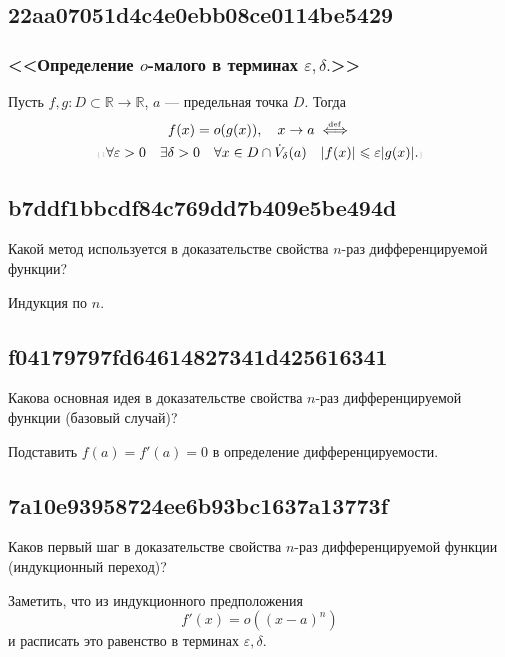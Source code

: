 \documentclass[11pt, a5paper]{article}
\newenvironment{note}[1]{\goodbreak\par\subsection{\hfill \color{lightgray}\tiny #1}}{}
\newenvironment{cloze}[2][\ldots]{\begin{leftbar}}{\end{leftbar}}
\newenvironment{icloze}[2][\ldots]{%
  \ignorespaces\text{\tiny \color{lightgray}\{#2} %
}{%
  \text{\tiny\color{lightgray}\}}\unskip%
}
\begin{document}
\begin{note}{22aa07051d4c4e0ebb08ce0114be5429}
    \subsubsection{<<Определение \( o \)-малого в терминах \( \varepsilon, \delta. \)>>}

    Пусть \( f, g : D \subset \mathbb R \to \mathbb R \), \( a \) --- предельная точка \( D \). Тогда
    \begin{multline*}
        f(x) = o(g(x)), \quad x \to a \overset{\hspace{-1pt}\text{\tiny def}}\iff \\
        \begin{icloze}{1}
            \forall \varepsilon > 0 \quad \exists \delta > 0 \quad \forall x \in D \cap \dot V_{\delta}(a) \quad |f(x)| \leqslant \varepsilon |g(x)|.
        \end{icloze}
    \end{multline*}
\end{note}

\begin{note}{b7ddf1bbcdf84c769dd7b409e5be494d}
    Какой метод используется в доказательстве свойства \( n \)-раз дифференцируемой функции?

    \begin{cloze}{1}
        Индукция по \( n. \)
    \end{cloze}
\end{note}

\begin{note}{f04179797fd64614827341d425616341}
    Какова основная идея в доказательстве свойства \( n \)-раз дифференцируемой функции (базовый случай)?

    \begin{cloze}{1}
        Подставить \( f(a) = f'(a) = 0 \) в определение дифференцируемости.
    \end{cloze}
\end{note}

\begin{note}{7a10e93958724ee6b93bc1637a13773f}
    Каков первый шаг в доказательстве свойства \( n \)-раз дифференцируемой функции (индукционный переход)?

    \begin{cloze}{1}
        Заметить, что из индукционного предположения
        \[
            f'(x) = o((x - a)^{n} )
        \]
        и расписать это равенство в терминах \( \varepsilon, \delta. \)
    \end{cloze}
\end{note}
\end{document}
